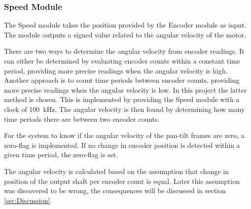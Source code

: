 \documentclass[../../main.tex]{subfiles}
\begin{document}



\subsubsection*{Speed Module}
The Speed module takes the position provided by the Encoder module as input. The module outputs a signed value related to the angular velocity of the motor. 

There are two ways to determine the angular velocity from encoder readings. It can either be determined by evaluating encoder counts within a constant time period, providing more precise readings when the angular velocity is high. Another approach is to count time periods between encoder counts, providing more precise readings when the angular velocity is low. In this project the latter method is chosen. This is implemented by providing the Speed module with a clock of \SI{100}{\kilo \hertz}. The angular velocity is then found by determining how many time periods there are between two encoder counts.

For the system to know if the angular velocity of the pan-tilt frames are zero, a zero-flag is implemented. If no change in encoder position is detected  within a given time period, the zero-flag is set.

The angular velocity is calculated based on the assumption that change in position of the output shaft per encoder count is equal. Later this assumption was discovered to be wrong, the consequences will be discussed in section \ref{sec:Discussion}.



 
\end{document}
